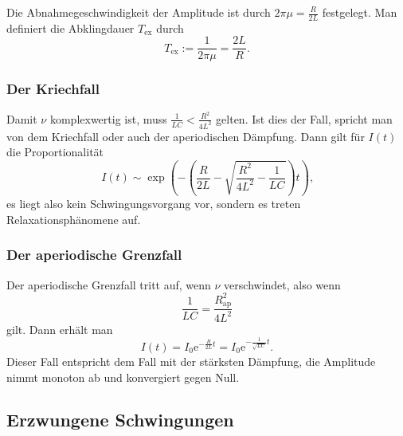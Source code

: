 Die Abnahmegeschwindigkeit der Amplitude ist durch $2 \pi \mu = \frac{R}{2L}$ festgelegt.
Man definiert die Abklingdauer $T_{\text{ex}}$ durch
\begin{equation}
	T_{\text{ex}} := \frac{1}{2 \pi \mu} = \frac{2L}{R} \text{.}
	\label{eqn:abkling}
\end{equation}

\subsubsection{Der Kriechfall}
Damit $\nu$ komplexwertig ist, muss $\frac{1}{LC} < \frac{R^2}{4L^2}$ gelten.
Ist dies der Fall, spricht man von dem Kriechfall oder auch der aperiodischen Dämpfung.
Dann gilt für $I(t)$ die Proportionalität
\begin{equation}
	I(t) \sim \exp\left(-\left(\frac{R}{2L} - \sqrt{\frac{R^2}{4L^2} - \frac{1}{LC}}\right)t\right) \text{,}
\end{equation}
es liegt also kein Schwingungsvorgang vor, sondern es treten Relaxationsphänomene auf.

\subsubsection{Der aperiodische Grenzfall}
Der aperiodische Grenzfall tritt auf, wenn $\nu$ verschwindet, also wenn
\begin{equation}
	\frac{1}{LC} = \frac{R_{\text{ap}}^2}{4L^2}
	\label{eqn:apigrenz}
\end{equation}
gilt.
Dann erhält man
\begin{equation}
	I(t) = I_0 \mathrm{e}^{-\frac{R}{2L} t} = I_0 \mathrm{e}^{-\frac{1}{\sqrt{LC}} t} \text{.}
\end{equation}
Dieser Fall entspricht dem Fall mit der stärksten Dämpfung, die Amplitude nimmt monoton ab und
konvergiert gegen Null.


\subsection{Erzwungene Schwingungen}

